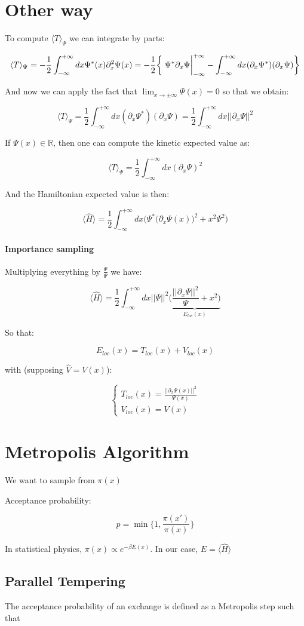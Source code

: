 \documentclass{book}
\begin{document}
\section{Other way}

To compute $\langle T\rangle_\Psi$ we can integrate by parts:

\[\langle T\rangle_\Psi=-\frac{1}{2}\int^{+\infty}_{-\infty} dx \Psi^*(x)\partial_x^2\Psi(x) =-\frac{1}{2}\bigg\{ \eval{\Psi^*\partial_x \Psi}_{-\infty}^{+\infty}-\int_{-\infty}^{+\infty}dx(\partial_x\Psi^*)(\partial_x\Psi)\bigg\}\]

And now we can apply the fact that $\displaystyle\lim_{x\to\pm\infty}\Psi(x)=0$ so that we obtain:

\[\langle T\rangle_\Psi=\frac{1}{2}\int_{-\infty}^{+\infty}dx(\partial_x\Psi^*)(\partial_x\Psi) = \frac{1}{2}\int_{-\infty}^{+\infty}dx||\partial_x\Psi||^2\]


If $\Psi(x)\in\mathbb{R}$, then one can compute the kinetic expected value as:

\[\langle T\rangle_\Psi=\frac{1}{2}\int_{-\infty}^{+\infty}dx(\partial_x\Psi)^2\]

And the Hamiltonian expected value is then:

\[\langle\hat{H}\rangle=\frac{1}{2}\int_{-\infty}^{+\infty}dx\bigg(  \Psi ^*\big(\partial_x\Psi(x)\big)^2+x^2\Psi^2\bigg)\]

\paragraph{Importance sampling} Multiplying everything by $\frac{\Psi}{\Psi}$ we have:

\[\langle\hat{H}\rangle=\frac{1}{2}\int_{-\infty}^{+\infty}dx||\Psi||^2\underbrace{\bigg(\frac{||\partial_x\Psi||^2}{\Psi}+x^2\bigg)}_{E_{loc}(x)}\]

So that:

\[E_{loc}(x) = T_{loc}(x)+V_{loc}(x)\]

with (supposing $\hat{V}=V(x)$):

\[\begin{cases}
    T_{loc}(x) = \frac{||\partial_x\Psi(x)||^2}{\Psi(x)}\\
    V_{loc}(x) = V(x)
\end{cases}\]

\section{Metropolis Algorithm}

We want to sample from $\pi(x)$

Acceptance probability:

\[p = \min\bigg\{1,\frac{\pi(x')}{\pi(x)}\bigg\}\]

In statistical physics, $\pi(x) \propto e^{-\beta E(x)}$. In our case, $E = \langle\hat{H}\rangle$

\subsection{Parallel Tempering}

The acceptance probability of an exchange is defined as a Metropolis step such that %
\end{document}
